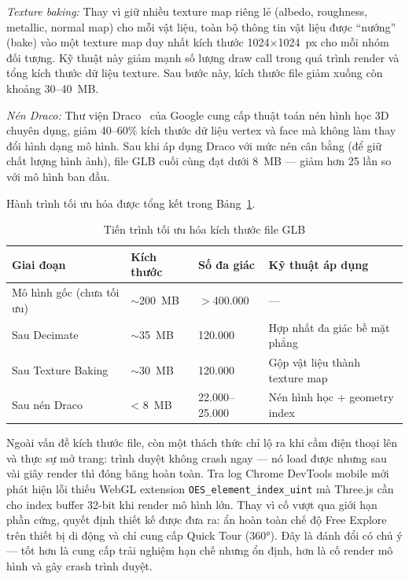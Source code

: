 \documentclass[../DoAn.tex]{subfiles}
\begin{document}
\textit{Texture baking:} Thay vì giữ nhiều texture map riêng lẻ (albedo,
roughness, metallic, normal map) cho mỗi vật liệu, toàn bộ thông tin vật liệu
được ``nướng'' (bake) vào một texture map duy nhất kích thước 1024×1024~px cho
mỗi nhóm đối tượng. Kỹ thuật này giảm mạnh số lượng draw call trong quá trình
render và tổng kích thước dữ liệu texture. Sau bước này, kích thước file giảm
xuống còn khoảng 30--40~MB.

\textit{Nén Draco:} Thư viện Draco~\cite{google2023draco} của Google cung cấp
thuật toán nén hình học 3D chuyên dụng, giảm 40--60\% kích thước dữ liệu
vertex và face mà không làm thay đổi hình dạng mô hình. Sau khi áp dụng Draco
với mức nén cân bằng (để giữ chất lượng hình ảnh), file GLB cuối cùng đạt dưới
8~MB --- giảm hơn 25 lần so với mô hình ban đầu.

Hành trình tối ưu hóa được tổng kết trong Bảng~\ref{tab:glb_optimization}.

\begin{table}[H]
\centering
\caption{Tiến trình tối ưu hóa kích thước file GLB}
\label{tab:glb_optimization}
\small
\begin{tabular}{|p{4.2cm}|p{2.2cm}|p{2.5cm}|p{4.3cm}|}
\hline
\textbf{Giai đoạn} & \textbf{Kích thước} & \textbf{Số đa giác} & \textbf{Kỹ thuật áp dụng} \\
\hline
Mô hình gốc (chưa tối ưu) & $\sim$200~MB & $>$400.000 & --- \\
\hline
Sau Decimate & $\sim$35~MB & 120.000 & Hợp nhất đa giác bề mặt phẳng \\
\hline
Sau Texture Baking & $\sim$30~MB & 120.000 & Gộp vật liệu thành texture map \\
\hline
Sau nén Draco & < 8~MB & 22.000--25.000 & Nén hình học + geometry index \\
\hline
\end{tabular}
\end{table}

Ngoài vấn đề kích thước file, còn một thách thức chỉ lộ ra khi cầm điện thoại
lên và thực sự mở trang: trình duyệt không crash ngay --- nó load được nhưng
sau vài giây render thì đóng băng hoàn toàn. Tra log Chrome DevTools mobile
mới phát hiện lỗi thiếu WebGL extension \texttt{OES\allowbreak\_element\allowbreak\_index\allowbreak\_uint}
mà Three.js cần cho index buffer 32-bit khi render mô hình lớn. Thay vì cố
vượt qua giới hạn phần cứng, quyết định thiết kế được đưa ra: ẩn hoàn toàn
chế độ Free Explore trên thiết bị di động và chỉ cung cấp Quick Tour (360°).
Đây là đánh đổi có chủ ý --- tốt hơn là cung cấp trải nghiệm hạn chế nhưng
ổn định, hơn là cố render mô hình và gây crash trình duyệt.
\end{document}
